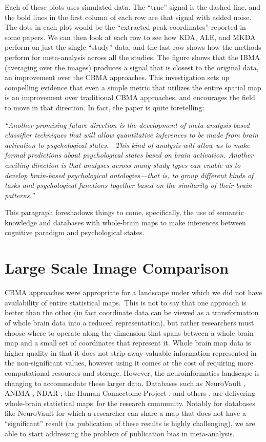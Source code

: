 \documentclass{report}
\begin{document}
Each of these plots uses simulated data. The ``true'' signal is the
dashed line, and the bold lines in the first column of each row are that
signal with added noise. The dots in each plot would be the ``extracted
peak coordinates'' reported in some papers. We can then look at each row
to see how KDA, ALE, and MKDA perform on just the single ``study'' data,
and the last row shows how the methods perform for meta-analysis across
all the studies. The figure shows that the IBMA (averaging over the
images) produces a signal that is closest to the original data, an
improvement over the CBMA approaches. This investigation sets up
compelling evidence that even a simple metric that utilizes the entire
spatial map is an improvement over traditional CBMA approaches, and
encourages the field to move in that direction. In fact, the paper is
quite foretelling:

\textit{``Another promising future direction is the development of
meta-analysis-based classifier techniques that will allow quantitative
inferences to be made from brain activation to psychological states.
~This kind of analysis will allow us to make formal predictions about
psychological states based on brain activation. Another exciting
direction is that analyses across many study types can enable us to
develop brain-based psychological ontologies---that is, to group
different kinds of tasks and psychological functions together based on
the similarity of their brain patterns.''}

This paragraph foreshadows things to come, specifically, the use of
semantic knowledge and databases with whole-brain maps to make
inferences between cognitive paradigm and psychological states.

\section{Large Scale Image Comparison}

CBMA approaches were appropriate for a landscape under which we did not
have availability of entire statistical maps.~This is not to say that
one approach is better than the other (in fact coordinate data can be
viewed as a transformation of whole brain data into a reduced
representation), but rather researchers must choose where to operate
along the dimension that spans between a whole brain map and a small set
of coordinates that represent it. Whole brain map data is higher quality
in that it does not strip away valuable information represented in the
non-significant values, however using it comes at the cost of requiring
more computational resources and storage. However, the neuroinformatics
landscape is changing to accommodate these larger data. Databases such
as NeuroVault \cite{Gorgolewski2015-gu}, ANIMA \cite{Reid2015-gt},
NDAR \cite{Hall2012-qo}, the Human Connectome Project \cite{Van_Essen2013-fi},
and others \cite{Book2016-ro,Landis2016-wo}, are delivering whole-brain
statistical maps~for the research community. Notably for databases like
NeuroVault for which a researcher can share a map that does not have a
``significant'' result (as publication of these results is highly
challenging), we are able to start addressing the problem of publication
bias in meta-analysis.
\end{document}
